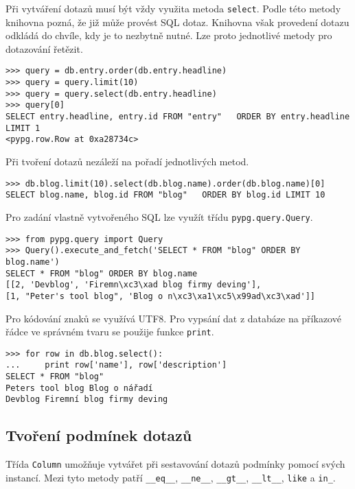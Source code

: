 \documentclass[11pt]{article}
\begin{document}
Při vytváření dotazů musí být vždy využita metoda \lstinline[style=inline]|select|. Podle této metody knihovna pozná, že již může provést SQL dotaz. Knihovna však provedení dotazu odkládá do chvíle, kdy je to nezbytně nutné. Lze proto jednotlivé metody pro dotazování řetězit.

\begin{lstlisting}[style=python]
>>> query = db.entry.order(db.entry.headline)
>>> query = query.limit(10)
>>> query = query.select(db.entry.headline)
>>> query[0]
SELECT entry.headline, entry.id FROM "entry"   ORDER BY entry.headline LIMIT 1
<pypg.row.Row at 0xa28734c>
\end{lstlisting}

Při tvoření dotazů nezáleží na pořadí jednotlivých metod.

\begin{lstlisting}[style=python]
>>> db.blog.limit(10).select(db.blog.name).order(db.blog.name)[0]
SELECT blog.name, blog.id FROM "blog"   ORDER BY blog.id LIMIT 10
\end{lstlisting}

Pro zadání vlastně vytvořeného SQL lze využít třídu \lstinline[style=inline]|pypg.query.Query|.

\begin{lstlisting}[style=python]
>>> from pypg.query import Query
>>> Query().execute_and_fetch('SELECT * FROM "blog" ORDER BY blog.name')
SELECT * FROM "blog" ORDER BY blog.name
[[2, 'Devblog', 'Firemn\xc3\xad blog firmy deving'],
[1, "Peter's tool blog", 'Blog o n\xc3\xa1\xc5\x99ad\xc3\xad']]
\end{lstlisting}

Pro kódování znaků se využívá UTF8. Pro vypsání dat z databáze na příkazové řádce ve správném tvaru se použije funkce \lstinline[style=inline]|print|.

\begin{lstlisting}[style=python]
>>> for row in db.blog.select():
...     print row['name'], row['description']
SELECT * FROM "blog"
Peters tool blog Blog o nářadí
Devblog Firemní blog firmy deving
\end{lstlisting}

\subsection{Tvoření podmínek dotazů}

Třída \lstinline[style=inline]|Column| umožňuje vytvářet při sestavování dotazů podmínky pomocí svých instancí. Mezi tyto metody patří \lstinline[style=inline]|__eq__|, \lstinline[style=inline]|__ne__|, \lstinline[style=inline]|__gt__|, \lstinline[style=inline]|__lt__|, \lstinline[style=inline]|like| a \lstinline[style=inline]|in_|.
\end{document}
